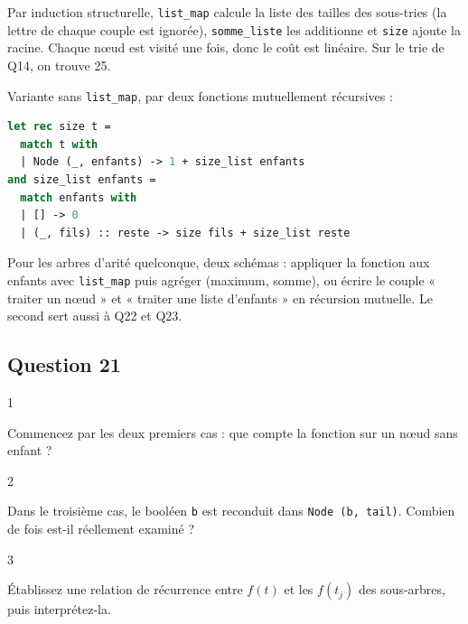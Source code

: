\documentclass[11pt,a4paper]{article}
\begin{document}
Par induction structurelle, \texttt{list\_map} calcule la liste des tailles des sous-tries (la lettre de chaque couple est ignorée), \texttt{somme\_liste} les additionne et \texttt{size} ajoute la racine. Chaque nœud est visité une fois, donc le coût est linéaire. Sur le trie de Q14, on trouve 25.

Variante sans \texttt{list\_map}, par deux fonctions mutuellement récursives :

\begin{lstlisting}[language=Caml]
let rec size t =
  match t with
  | Node (_, enfants) -> 1 + size_list enfants
and size_list enfants =
  match enfants with
  | [] -> 0
  | (_, fils) :: reste -> size fils + size_list reste
\end{lstlisting}

\begin{methode}

Pour les arbres d'arité quelconque, deux schémas : appliquer la fonction aux enfants avec \texttt{list\_map} puis agréger (maximum, somme), ou écrire le couple « traiter un nœud » et « traiter une liste d'enfants » en récursion mutuelle. Le second sert aussi à Q22 et Q23.

\end{methode}

\hypertarget{question-21}{%
\subsection{Question 21}\label{question-21}}

\begin{indication}{1}

Commencez par les deux premiers cas : que compte la fonction sur un nœud sans enfant ?

\end{indication}

\begin{indication}{2}

Dans le troisième cas, le booléen \texttt{b} est reconduit dans \texttt{Node\ (b,\ tail)}. Combien de fois est-il réellement examiné ?

\end{indication}

\begin{indication}{3}

Établissez une relation de récurrence entre \(f(t)\) et les \(f(t_j)\) des sous-arbres, puis interprétez-la.

\end{indication}
\end{document}

